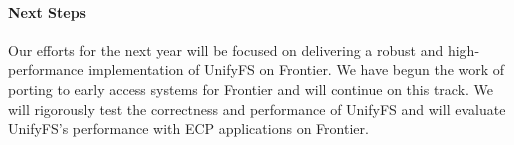 %

\paragraph{Next Steps}

Our efforts for the next year will be focused on delivering a robust and 
high-performance implementation of UnifyFS on Frontier. We have begun the work
of porting to early access systems for Frontier and will continue on this track. 
We will rigorously test the correctness and performance of UnifyFS and will
evaluate UnifyFS's performance with ECP applications on Frontier.

